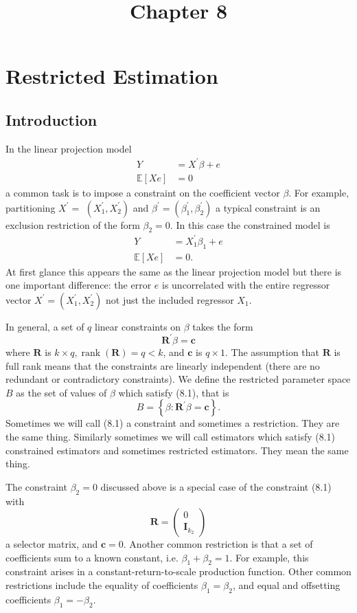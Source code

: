 \documentclass[10pt]{article}
\title{Chapter 8 }
\author{}
\date{}
\begin{document}
\maketitle
\section{Restricted Estimation}
\subsection{Introduction}
In the linear projection model
$$
\begin{aligned}
Y &=X^{\prime} \beta+e \\
\mathbb{E}[X e] &=0
\end{aligned}
$$
a common task is to impose a constraint on the coefficient vector $\beta$. For example, partitioning $X^{\prime}=$ $\left(X_{1}^{\prime}, X_{2}^{\prime}\right)$ and $\beta^{\prime}=\left(\beta_{1}^{\prime}, \beta_{2}^{\prime}\right)$ a typical constraint is an exclusion restriction of the form $\beta_{2}=0$. In this case the constrained model is
$$
\begin{aligned}
Y &=X_{1}^{\prime} \beta_{1}+e \\
\mathbb{E}[X e] &=0 .
\end{aligned}
$$
At first glance this appears the same as the linear projection model but there is one important difference: the error $e$ is uncorrelated with the entire regressor vector $X^{\prime}=\left(X_{1}^{\prime}, X_{2}^{\prime}\right)$ not just the included regressor $X_{1}$.

In general, a set of $q$ linear constraints on $\beta$ takes the form
$$
\boldsymbol{R}^{\prime} \beta=\boldsymbol{c}
$$
where $\boldsymbol{R}$ is $k \times q, \operatorname{rank}(\boldsymbol{R})=q<k$, and $\boldsymbol{c}$ is $q \times 1$. The assumption that $\boldsymbol{R}$ is full rank means that the constraints are linearly independent (there are no redundant or contradictory constraints). We define the restricted parameter space $B$ as the set of values of $\beta$ which satisfy (8.1), that is
$$
B=\left\{\beta: \boldsymbol{R}^{\prime} \beta=\boldsymbol{c}\right\} .
$$
Sometimes we will call (8.1) a constraint and sometimes a restriction. They are the same thing. Similarly sometimes we will call estimators which satisfy (8.1) constrained estimators and sometimes restricted estimators. They mean the same thing.

The constraint $\beta_{2}=0$ discussed above is a special case of the constraint (8.1) with
$$
\boldsymbol{R}=\left(\begin{array}{c}
0 \\
\boldsymbol{I}_{k_{2}}
\end{array}\right)
$$
a selector matrix, and $\boldsymbol{c}=0 .$ Another common restriction is that a set of coefficients sum to a known constant, i.e. $\beta_{1}+\beta_{2}=1$. For example, this constraint arises in a constant-return-to-scale production function. Other common restrictions include the equality of coefficients $\beta_{1}=\beta_{2}$, and equal and offsetting coefficients $\beta_{1}=-\beta_{2}$.
\end{document}

